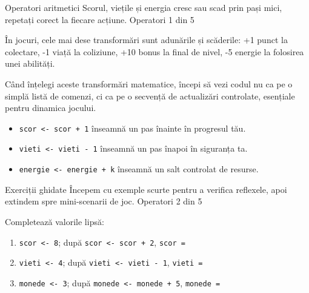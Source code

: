 \PageHeader
  {Operatori aritmetici}
  {Scorul, viețile și energia cresc sau scad prin pași mici, repetați corect la fiecare acțiune.}
  {Operatori 1 din 5}

\begin{missionbox}
În jocuri, cele mai dese transformări sunt adunările și scăderile: +1 punct la colectare, -1 viață la coliziune, +10 bonus la final de nivel, -5 energie la folosirea unei abilități.

Când înțelegi aceste transformări matematice, începi să vezi codul nu ca pe o simplă listă de comenzi, ci ca pe o secvență de actualizări controlate, esențiale pentru dinamica jocului.
\end{missionbox}

\begin{conceptbox}[Reținem!]
\begin{itemize}
\item \texttt{scor <- scor + 1} înseamnă un pas înainte în progresul tău.
\item \texttt{vieti <- vieti - 1} înseamnă un pas înapoi în siguranța ta.
\item \texttt{energie <- energie + k} înseamnă un salt controlat de resurse.
\end{itemize}
\end{conceptbox}



\clearpage

\PageHeader
  {Exerciții ghidate}
  {Începem cu exemple scurte pentru a verifica reflexele, apoi extindem spre mini-scenarii de joc.}
  {Operatori 2 din 5}

\begin{guidebox}
Completează valorile lipsă:
\begin{enumerate}
\item \texttt{scor <- 8}; după \texttt{scor <- scor + 2}, \texttt{scor = } 
\item \texttt{vieti <- 4}; după \texttt{vieti <- vieti - 1}, \texttt{vieti = } 
\item \texttt{monede <- 3}; după \texttt{monede <- monede + 5}, \texttt{monede = } 
\end{enumerate}
\end{guidebox}


